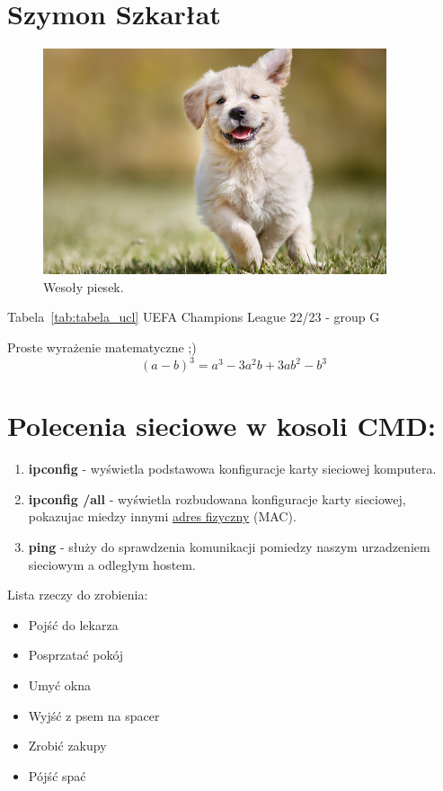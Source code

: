 \section{Szymon Szkarłat}
\label{sec:szymon_szkarlat}


\begin{figure}[htbp]
    \centering
    \includegraphics[width=0.9\textwidth]{pictures/pies.jpg}
    \caption{Wesoły piesek.}
    \label{fig:dog}
\end{figure}

Tabela~\ref{tab:tabela_ucl} UEFA Champions League 22/23 - group G



{\Large Proste wyrażenie matematyczne ;)
 \[(a-b)^3=a^3 - 3a^2b + 3ab^2 - b^3\]}

\section*{Polecenia sieciowe w kosoli CMD:}
\begin{enumerate}
  \item \textbf{ipconfig} - wyświetla podstawowa konfiguracje karty sieciowej komputera.
  \item \textbf{ipconfig /all} - wyświetla rozbudowana konfiguracje karty sieciowej, pokazujac miedzy innymi \underline{adres fizyczny} (MAC).
  \item \textbf{ping} - służy do sprawdzenia komunikacji pomiedzy naszym urzadzeniem sieciowym a odległym hostem.
\end{enumerate}

Lista rzeczy do zrobienia:
\begin{itemize}
  \item Pojść do lekarza
  \item Posprzatać pokój 
  \item Umyć okna
  \item Wyjść z psem na spacer
  \item Zrobić zakupy
  \item Pójść spać
\end{itemize}

